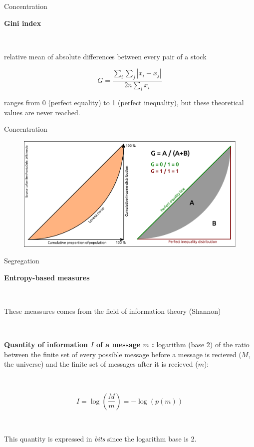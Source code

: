 \begin{frame}{Concentration}

\textbf{Gini index}

~

relative mean of absolute differences between every pair of a stock 

\begin{equation}
\nonumber
G = \frac{\sum_i \sum_j |x_i - x_j|}{2n \sum_i x_i}
\end{equation}


ranges from 0 (perfect equality) to 1 (perfect inequality), but these theoretical values are never reached.





\end{frame}	



\begin{frame}{Concentration}


\begin{figure}
\includegraphics[width=12cm]{Lorenz_EN.pdf}
\end{figure}

\end{frame}


\begin{frame}{Segregation}

\textbf{Entropy-based measures}

~

These meassures comes from the field of information theory (Shannon)

 ~

\textbf{Quantity of information $I$ of a message $m$ :} logarithm (base 2) of the ratio between the finite set of every possible message before a message is recieved ($M$, the universe) and  the finite set of  messages after it is recieved ($m$):

~

\begin{equation}
\nonumber
  I = \log\left(\frac{M}{m} \right) = - \log(p(m))
\end{equation}

~

This quantity is expressed in \emph{bits} since the logarithm base is 2.

\end{frame}


